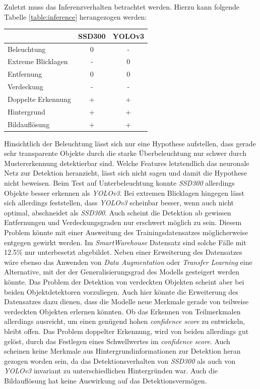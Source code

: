 Zuletzt muss das Inferenzverhalten betrachtet werden. Hierzu kann folgende Tabelle \ref{table:inference} herangezogen werden:

\begin{center}
	\begin{tabular}[h]{l|c|c}
		 & SSD300 & YOLOv3 \\
		\hline
		Beleuchtung & 0 & - \\
		Extreme Blicklagen & - & 0 \\
		Entfernung & 0 & 0 \\
		Verdeckung & - & - \\
		Doppelte Erkennung & + & + \\
		Hintergrund & + & + \\
		Bildauflösung & + & + \\
	\end{tabular}
	\label{table:inference}
\end{center}

Hinsichtlich der Beleuchtung lässt sich nur eine Hypothese aufstellen, dass gerade sehr transparente Objekte durch die starke Überbeleuchtung nur schwer durch Mustererkennung detektierbar sind. Welche Features letztendlich das neuronale Netz zur Detektion heranzieht, lässt sich nicht sagen und damit die Hypothese nicht beweisen. Beim Test auf Unterbeleuchtung konnte \textit{SSD300} allerdings Objekte besser erkennen als \textit{YOLOv3}. Bei extremen Blicklagen hingegen lässt sich allerdings feststellen, dass \textit{YOLOv3} scheinbar besser, wenn auch nicht optimal, abschneidet als \textit{SSD300}. Auch scheint die Detektion ab gewissen Entfernungen und Verdeckungsgraden nur erschwert möglich zu sein. Diesem Problem könnte mit einer Ausweitung des Trainingsdatensatzes möglicherweise entgegen gewirkt werden. Im \textit{SmartWarehouse} Datensatz sind solche Fälle mit 12.5\% nur unterbesetzt abgebildet. Neben einer Erweiterung des Datensatzes wäre ebenso das Anwenden von \textit{Data Augmentation} oder \textit{Transfer Learning} eine Alternative, mit der der Generalisierungsgrad des Modells gesteigert werden könnte. Das Problem der Detektion von verdeckten Objekten scheint aber bei beiden Objektdetektoren vorzuliegen. Auch hier könnte die Erweiterung des Datensatzes dazu dienen, dass die Modelle neue Merkmale gerade von teilweise verdeckten Objekten erlernen könnten. Ob das Erkennen von Teilmerkmalen allerdings ausreicht, um einen genügend hohen \textit{confidence score} zu entwickeln, bleibt offen. Das Problem doppelter Erkennung, wird von beiden allerdings gut gelöst, durch das Festlegen eines Schwellwertes im \textit{confidence score}. Auch scheinen keine Merkmale aus Hintergrundinformationen zur Detektion heran gezogen worden sein, da das Detektionsverhalten von \textit{SSD300} als auch von \textit{YOLOv3} invariant zu unterschiedlichen Hintergründen war. Auch die Bildauflösung hat keine Auswirkung auf das Detektionsvermögen.

